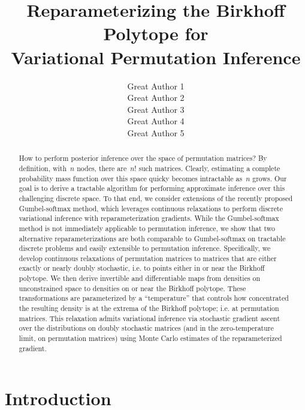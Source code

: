 \documentclass{article}
\title{Reparameterizing the Birkhoff Polytope for \\ Variational Permutation Inference}
\author{
  Great Author 1 \\
  \And
  Great Author 2 \\
  \And
  Great Author 3 \\
  \And
  Great Author 4 \\
  \And
  Great Author 5 \\
}
\begin{document}
\maketitle

\begin{abstract}
  How to perform posterior inference over the space of permutation
  matrices?  By definition, with~$n$ nodes, there are~$n!$ such
  matrices.  Clearly, estimating a complete probability mass function
  over this space quicky becomes intractable as~$n$ grows. Our goal is
  to derive a tractable algorithm for performing approximate inference
  over this challenging discrete space.  To that end, we consider
  extensions of the recently proposed Gumbel-softmax method, which
  leverages continuous relaxations to perform discrete variational
  inference with reparameterization gradients. While the
  Gumbel-softmax method is not immediately applicable to permutation
  inference, we show that two alternative reparameterizations are both
  comparable to Gumbel-softmax on tractable discrete problems and
  easily extensible to permutation inference. Specifically, we develop
  continuous relaxations of permutation matrices to matrices that are
  either exactly or nearly doubly stochastic, i.e. to points either in
  or near the Birkhoff polytope.  We then derive invertible and
  differentiable maps from densities on unconstrained space to
  densities on or near the Birkhoff polytope. These transformations
  are parameterized by a ``temperature'' that controls how
  concentrated the resulting density is at the extrema of the Birkhoff
  polytope; i.e. at permutation matrices.  This relaxation admits
  variational inference via stochastic gradient ascent over the
  distributions on doubly stochastic matrices (and in the
  zero-temperature limit, on permutation matrices) using Monte Carlo
  estimates of the reparameterized gradient.
\end{abstract}

\section{Introduction}
\end{document}
